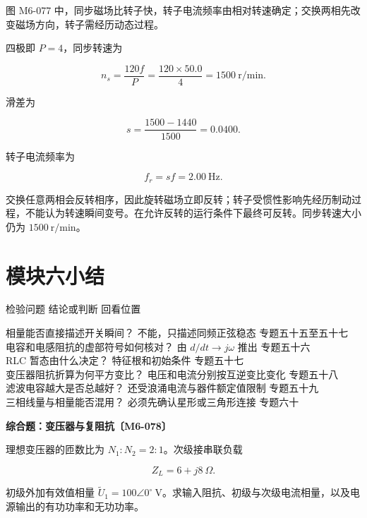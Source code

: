 图 M6-077
中，同步磁场比转子快，转子电流频率由相对转速确定；交换两相先改变磁场方向，转子需经历动态过程。

四极即 \(P=4\)，同步转速为

\[
n_s=\frac{120f}{P}=\frac{120\times50.0}{4}=1500\ \mathrm{r/min}.
\]

滑差为

\[
s=\frac{1500-1440}{1500}=0.0400.
\]

转子电流频率为

\[
\boxed{f_r=sf=2.00\ \mathrm{Hz}}.
\]

交换任意两相会反转相序，因此旋转磁场立即反转；转子受惯性影响先经历制动过程，不能认为转速瞬间变号。在允许反转的运行条件下最终可反转。同步转速大小仍为
\(1500\ \mathrm{r/min}\)。

\section{模块六小结}\label{m6:ux6a21ux5757ux516dux5c0fux7ed3}

检验问题 \textbar{} 结论或判断 \textbar{} 回看位置 \textbar{}

相量能否直接描述开关瞬间？ \textbar{} 不能，只描述同频正弦稳态
\textbar{} 专题五十五至五十七 \textbar{}\\
电容和电感阻抗的虚部符号如何核对？ \textbar{} 由 \(d/dt\to j\omega\)
推出 \textbar{} 专题五十六 \textbar{}\\
RLC 暂态由什么决定？ \textbar{} 特征根和初始条件 \textbar{} 专题五十七
\textbar{}\\
变压器阻抗折算为何平方变比？ \textbar{} 电压和电流分别按互逆变比变化
\textbar{} 专题五十八 \textbar{}\\
滤波电容越大是否总越好？ \textbar{} 还受浪涌电流与器件额定值限制
\textbar{} 专题五十九 \textbar{}\\
三相线量与相量能否混用？ \textbar{} 必须先确认星形或三角形连接
\textbar{} 专题六十 \textbar{}

\par{}
\noindent\begin{minipage}{\linewidth}

\textbf{综合题：变压器与复阻抗〔M6-078〕}

理想变压器的匝数比为 \(N_1:N_2=2:1\)。次级接串联负载

\[
Z_L=6+j8\ \Omega.
\]

初级外加有效值相量
\(\widetilde U_1=100\angle0^{\circ}\ \mathrm V\)。求输入阻抗、初级与次级电流相量，以及电源输出的有功功率和无功功率。

\end{minipage}\par


